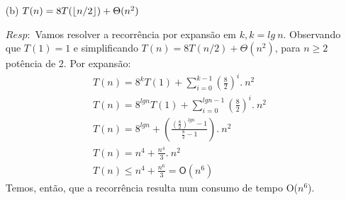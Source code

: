 \documentclass{homework}
\DeclarePairedDelimiter\floor{\lfloor}{\rfloor}
\begin{document}
\pagestyle{fancy}

	\begin{enumerate}
		\item[(b)] $T(n) = 8T(\floor{n/2})+\Theta(n^2)$
		\item[$Resp:$] Vamos resolver a recorrência por expansão em $k, k = lg\ n$. Observando que $T(1) = 1$ e simplificando $T(n) = 8T(n/2)+\Theta(n^2)$, para $n \geq 2$ potência de 2. Por expansão:
				\begin{align*}
					& T(n) = 8^kT\left(1\right) + \sum_{i=0}^{k-1} \left(\frac{8}{2}\right)^i.\ n^2\\
					& T(n) = 8^{lgn}T\left(1\right) + \sum_{i=0}^{lgn-1} \left(\frac{8}{2}\right)^i.\ n^2\\	
					& T(n) = 8^{lgn} + \left( \frac{\left( \frac{8}{2} \right)^{lgn} - 1}{\frac{8}{2} - 1} \right).\ n^2\\
					& T(n) = n^4 + \frac{n^4}{3} .\ n^2\\
					& T(n) \leq n^4 + \frac{n^6}{3} = \mathsf{O}(n^6)
				\end{align*}
		Temos, então, que a recorrência resulta num consumo de tempo O($n^6$).
	\end{enumerate}	
	
\pagebreak	
		
\end{document}
